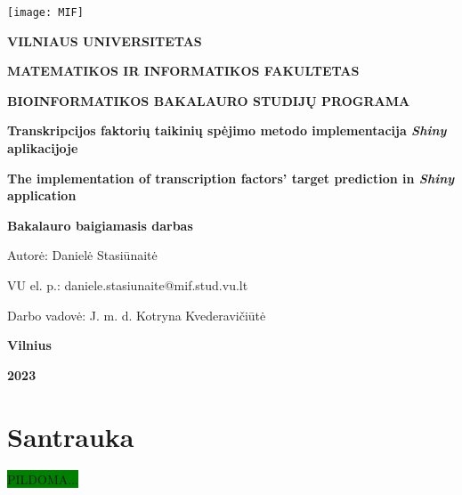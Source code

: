 \documentclass[12pt]{article}
\begin{document}

\begin{titlepage}
\vskip 20pt
\begin{center}
\texttt{[image: MIF]}
\end{center}


\vskip 20pt
\centerline{\bf \large \textbf{VILNIAUS UNIVERSITETAS}}
\bigskip
\centerline{\large \textbf{MATEMATIKOS IR INFORMATIKOS FAKULTETAS}}
\bigskip
\centerline{\large \textbf{BIOINFORMATIKOS BAKALAURO STUDIJŲ PROGRAMA}}



\vskip 90pt
\begin{center}
    {\bf \LARGE Transkripcijos faktorių taikinių spėjimo metodo implementacija
    \emph{Shiny} aplikacijoje}
\end{center}
\begin{center}
    {\bf \Large The implementation of transcription factors' target prediction
    in \emph{Shiny} application}
\end{center}
\vskip 20pt
\centerline{\bf \large \textbf{Bakalauro baigiamasis darbas}}
\bigskip
\vskip 40pt

\hskip 140pt {\large Autorė: Danielė Stasiūnaitė}

\hskip 140pt{\large VU el. p.: daniele.stasiunaite@mif.stud.vu.lt}
\bigskip
\vskip 20pt

\hskip 140pt {\large Darbo vadovė: J. m. d. Kotryna Kvederavičiūtė}
\vskip 60pt
\vskip 40pt
\centerline{\large \textbf{Vilnius}}
\centerline{\large \textbf{2023}}
\newpage
\end{titlepage}



\tableofcontents
\newpage


\section*{Santrauka}
\colorbox{green}{PILDOMA...}
\end{document}
